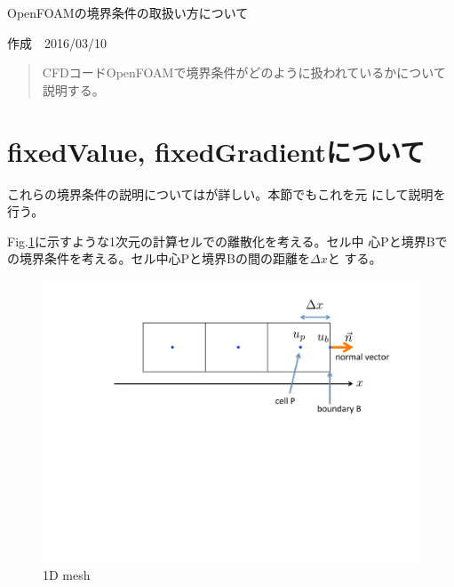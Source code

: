 \documentclass[a4paper,fleqn]{jsarticle}
\begin{document}
\thispagestyle{plain}
\begin{flushleft}
\begin{Large}
OpenFOAMの境界条件の取扱い方について
\end{Large}
\end{flushleft}

\begin{flushright}
作成　2016/03/10\\
\end{flushright}


\begin{abstract}
CFDコードOpenFOAMで境界条件がどのように扱われているかについて説明する。
\end{abstract}


\hrulefill



\section{fixedValue, fixedGradientについて}
これらの境界条件の説明については\cite{Nozaki}が詳しい。本節でもこれを元
にして説明を行う。

Fig.\ref{fig:cell}に示すような1次元の計算セルでの離散化を考える。セル中
心Pと境界Bでの境界条件を考える。セル中心Pと境界Bの間の距離を$\Delta x$と
する。
 \begin{figure}[htbp]
  \begin{center}
   \includegraphics[scale=0.4]{Fig/cell.pdf}
   \caption{1D mesh}
   \label{fig:cell}
  \end{center}
\end{figure}
\end{document}
